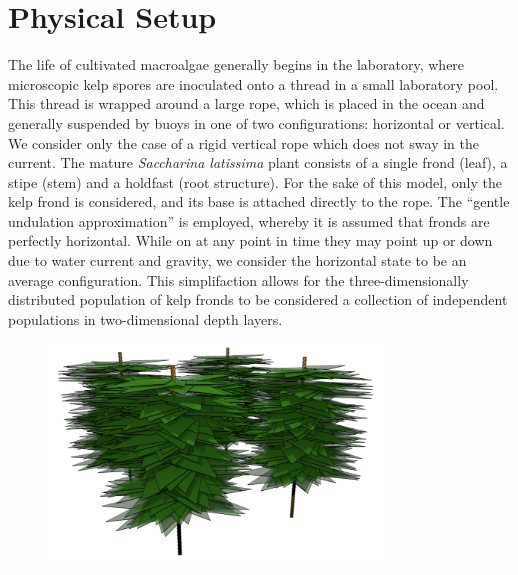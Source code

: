 \documentclass[ms,cpyr,lof,lot]{uathesis}
\begin{document}
\section{Physical Setup}
The life of cultivated macroalgae generally begins in the laboratory, where microscopic kelp spores are inoculated onto a thread in a small laboratory pool. 
This thread is wrapped around a large rope, which is placed in the ocean and generally suspended by buoys in one of two configurations: horizontal or vertical.
We consider only the case of a rigid vertical rope which does not sway in the current.
The mature \textit{Saccharina latissima} plant consists of a single frond (leaf), a stipe (stem) and a holdfast (root structure).
For the sake of this model, only the kelp frond is considered, and its base is attached directly to the rope.
The ``gentle undulation approximation'' is employed, whereby it is assumed that fronds are perfectly horizontal.
While on at any point in time they may point up or down due to water current and gravity, we consider the horizontal
state to be an average configuration.
This simplifaction allows for the three-dimensionally distributed population of kelp fronds
to be considered a collection of independent populations in two-dimensional depth layers.

\begin{figure}[H]
	\centering
	\includegraphics[width=3.5in]{kelp_array}
\end{figure}
\end{document}
